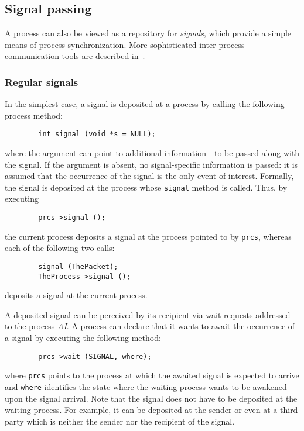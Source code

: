 \subsection{Signal passing}
\label{rm_pr_sp}

A process can also be viewed as a repository for {\em signals}, which
provide a simple means of process synchronization.
More sophisticated inter-process communication tools are described
in~.

\subsubsection{Regular signals}
\label{rm_pr_sp_rs}

In the simplest case, a signal is deposited at a process by calling
the following process method:
\begin{verbatim}
        int signal (void *s = NULL);
\end{verbatim}
where the argument can point to additional information---to
be passed along with the signal.
If the argument is absent, no signal-specific information is passed: it is
assumed that the occurrence of the signal is the only event of interest.
Formally, the signal is deposited at the process whose {\tt signal} method
is called.
Thus, by executing
\begin{verbatim}
        prcs->signal ();
\end{verbatim}
the current process deposits a signal at the process pointed to by
{\tt prcs}, whereas each of the following two calls:
\begin{verbatim}
        signal (ThePacket);
        TheProcess->signal ();
\end{verbatim}
deposits a signal at the current process.

A deposited signal can be perceived by its recipient via wait requests
addressed to the process {\em AI}.
A process can declare that it wants to await the occurrence of a signal
by executing the following method:
\begin{verbatim}
        prcs->wait (SIGNAL, where);
\end{verbatim}
where {\tt prcs} points to the process at which the awaited signal is expected
to arrive and {\tt where} identifies the state where the waiting
process wants to be awakened upon the signal arrival.
Note that the signal does not have to be deposited at the waiting process.
For example, it can be deposited at the sender or even at a third party which
is neither the sender nor the recipient of the signal.

